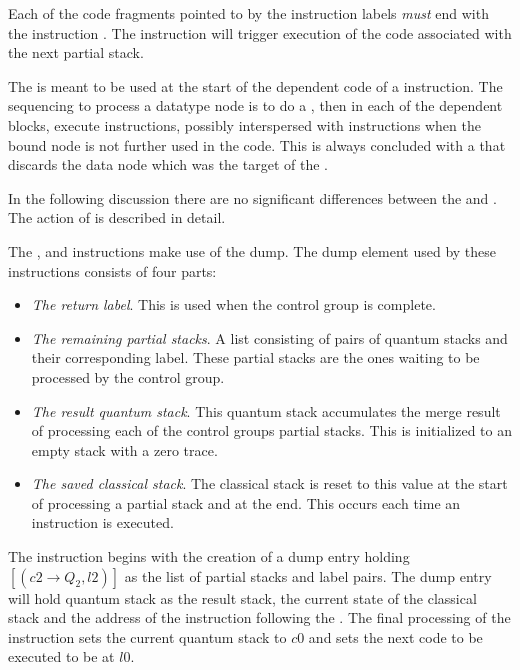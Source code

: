 Each of the code fragments pointed to 
by the instruction labels \emph{must} end with the instruction
. The  instruction  will trigger execution
 of the code associated with the 
next partial stack. 


The  is meant to be used at the start of the dependent
 code of a  instruction.
The  sequencing to process a datatype node is to
do a , then in each of the dependent blocks, execute
 instructions, possibly interspersed with 
 instructions when the bound node is not further used
in the code.
This is always concluded with a  that discards the data node
which was the target of the .

In the following discussion there are no significant differences between the
 and . The action of
 is described in detail.

The ,  and 
 instructions make  use of the dump. The dump element
used by these instructions consists of four parts: 
\begin{itemize}
\item{}\emph{The return label}. This is used 
when the control group is complete.
\item{}\emph{The remaining partial stacks}. A list consisting 
of pairs of quantum stacks and 
their corresponding label. These partial stacks are the ones waiting
 to be processed by the control group. 
\item{}\emph{The result quantum stack}. This quantum stack 
 accumulates the merge result of 
processing each of the control groups partial stacks. This is initialized
to an empty stack with a zero trace.
\item{}\emph{The saved classical stack}. The classical stack is reset to this
value at the start of processing a partial stack and at the end. This 
occurs each time an  instruction is executed.
\end{itemize}


The instruction 
 begins with the creation
of a  dump entry holding
$[(c2 \rightarrow Q_2,l2)]$ as the
list of partial stacks and label pairs. The 
dump entry will hold  quantum stack as
the result stack, 
the current state of the classical stack  and the address of the 
instruction following the .
The final processing of the 
 instruction sets the current quantum stack to 
$c0$ and sets the next code 
to be executed to be at $l0$. 


